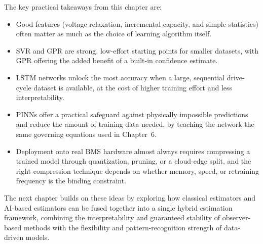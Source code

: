 The key practical takeaways from this chapter are:
\begin{itemize}
    \item Good features (voltage relaxation, incremental capacity, and simple statistics) often matter as much as the choice of learning algorithm itself.
    \item SVR and GPR are strong, low-effort starting points for smaller datasets, with GPR offering the added benefit of a built-in confidence estimate.
    \item LSTM networks unlock the most accuracy when a large, sequential drive-cycle dataset is available, at the cost of higher training effort and less interpretability.
    \item PINNs offer a practical safeguard against physically impossible predictions and reduce the amount of training data needed, by teaching the network the same governing equations used in Chapter~6.
    \item Deployment onto real BMS hardware almost always requires compressing a trained model through quantization, pruning, or a cloud-edge split, and the right compression technique depends on whether memory, speed, or retraining frequency is the binding constraint.
\end{itemize}

The next chapter builds on these ideas by exploring how classical estimators and AI-based estimators can be fused together into a single hybrid estimation framework, combining the interpretability and guaranteed stability of observer-based methods with the flexibility and pattern-recognition strength of data-driven models.